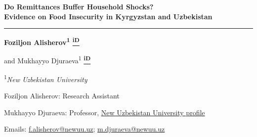 \documentclass[11pt]{article}
\newcommand{\orcidlink}[1]{%
  \href{https://orcid.org/#1}{\textsuperscript{\textcolor{green!50!black}{\scriptsize\bfseries iD}}}%
}
\begin{document}
\begin{center}
{\Large\bfseries\textcolor{teal!45!black}{Do Remittances Buffer Household Shocks?\\Evidence on Food Insecurity in Kyrgyzstan and Uzbekistan}\par}
\vspace{0.4em}
\textcolor{teal!45!black}{\rule{0.94\textwidth}{0.6pt}}
\end{center}

\begin{flushleft}
\vspace{1.3em}
{\large\bfseries
Foziljon Alisherov\textsuperscript{1}\orcidlink{0009-0004-9451-0518}
and
Mukhayyo Djuraeva\textsuperscript{1}\orcidlink{0000-0001-6163-7513}
\par}

\vspace{0.7em}
{\normalsize\textsuperscript{1}\textit{New Uzbekistan University}\par}

\vspace{0.55em}
{\normalsize Foziljon Alisherov: Research Assistant\par}
{\normalsize Mukhayyo Djuraeva: Professor,
\href{https://www.newuu.uz/en/employee/view/faculty-members/419}{New Uzbekistan University profile}\par}

\vspace{0.55em}
{\normalsize Emails:
\href{mailto:f.alisherov@newuu.uz}{f.alisherov@newuu.uz};
\href{mailto:m.djuraeva@newuu.uz}{m.djuraeva@newuu.uz}\par}

\end{flushleft}
\end{document}
